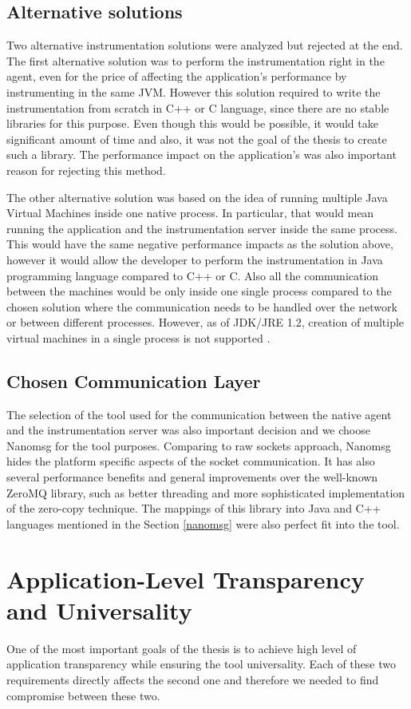 \subsection{Alternative solutions}
Two alternative instrumentation solutions were analyzed but rejected at the end. The first alternative solution was to perform the instrumentation right in the agent, even for the price of affecting the application's performance by instrumenting in the same JVM. However this solution required to write the instrumentation from scratch in C++ or C language, since there are no stable libraries for this purpose. Even though this would be possible, it would take significant amount of time and also, it was not the goal of the thesis to create such a library. The performance impact on the application's was also important reason for rejecting this method.

The other alternative solution was based on the idea of running multiple Java Virtual Machines inside one native process. In particular, that would mean running the application and the instrumentation server inside the same process. This would have the same  negative performance impacts as the solution above, however it would allow the developer to perform the instrumentation in Java programming language compared to C++ or C. Also all the communication between the machines would be only inside one single process compared to the chosen solution where the communication needs to be handled over the network or between different processes. However, as of JDK/JRE 1.2, creation of multiple virtual machines in a single process is not supported \cite{MoreJVMOnceProccess}.
							
\subsection{Chosen Communication Layer}
The selection of the tool used for the communication between the native agent and the instrumentation server was also important decision and we choose Nanomsg for the tool purposes. Comparing to raw sockets approach, Nanomsg hides the platform specific aspects of the socket communication. It has also several performance benefits and general improvements over the well-known ZeroMQ library, such as better threading and more sophisticated implementation of the zero-copy technique. The mappings of this library into Java and C++ languages mentioned in the Section \ref{nanomsg} were also perfect fit into the tool.
		

\section{Application-Level Transparency and Universality}
One of the most important goals of the thesis is to achieve high level of application transparency while ensuring the tool universality. Each of these two requirements directly affects the second one and therefore we needed to find compromise between these two.


